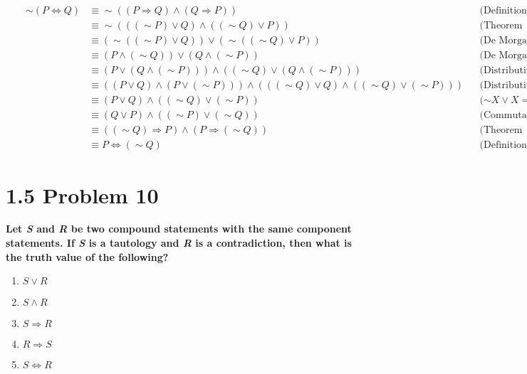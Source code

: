 \documentclass[10pt]{article}
\begin{document}
\begin{enumerate}[label=(\alph*)]
    \begin{align*}
        && \sim (P \Leftrightarrow Q) &\equiv \sim ((P \Rightarrow Q) \wedge (Q \Rightarrow P)) &&
        \text{(Definition of a biconditional)} \\
        && &\equiv \sim (((\sim P) \vee Q) \wedge ((\sim Q) \vee P)) && \text{(Theorem 1.48)} \\
        && &\equiv (\sim ((\sim P) \vee Q)) \vee (\sim ((\sim Q) \vee P)) &&
        \text{(De Morgan's Law)} \\
        && &\equiv (P \wedge (\sim Q)) \vee (Q \wedge (\sim P)) && \text{(De Morgan's Law)} \\
        && &\equiv (P \vee (Q \wedge (\sim P))) \wedge ((\sim Q) \vee (Q \wedge (\sim P))) &&
        \text{(Distributive property)} \\
        && &\equiv ((P \vee Q) \wedge (P \vee (\sim P))) \wedge (((\sim Q) 
        \vee Q) \wedge ((\sim Q) \vee (\sim P))) && \text{(Distributive property)} \\
        && &\equiv (P \vee Q) \wedge ((\sim Q) \vee (\sim P)) && \text{($\sim X \vee X = T$)} \\
        && &\equiv (Q \vee P) \wedge ((\sim P) \vee (\sim Q)) && \text{(Commutative property)} \\
        && &\equiv ((\sim Q) \Rightarrow P) \wedge (P \Rightarrow (\sim Q)) &&
        \text{(Theorem 1.48)} \\
        && &\equiv P \Leftrightarrow (\sim Q) && \text{(Definition of a biconditional)}
    \end{align*}

\end{enumerate}



\section{1.5 Problem 10}
\textbf{Let \textit{S} and \textit{R} be two compound statements with the same
component statements. If \textit{S} is a tautology and \textit{R} is a contradiction,
then what is the truth value of the following?}

\begin{enumerate}[label=(\alph*)]
    
    \item \textbf{$S \vee R$}

    \item \textbf{$S \wedge R$}

    \item \textbf{$S \Rightarrow R$}

    \item \textbf{$R \Rightarrow S$}

    \item \textbf{$S \Leftrightarrow R$}

\end{enumerate}
\end{document}
